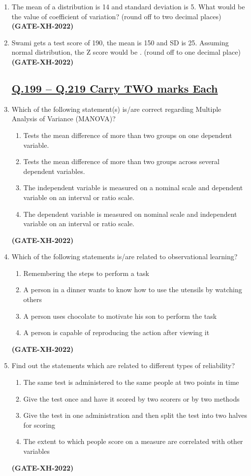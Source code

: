 \documentclass[journal]{IEEEtran}
\begin{document}
\begin{enumerate}
\item The mean of a distribution is 14 and standard deviation is 5. What would be the value of coefficient of variation? (round off to two decimal places)
\hfill\textbf{(GATE-XH-2022)}

\item Swami gets a test score of 190, the mean is 150 and SD is 25. Assuming normal distribution, the Z score would be \underline{\hspace{2cm}}. (round off to one decimal place)
\hfill\textbf{(GATE-XH-2022)}

\subsection*{\underline{\textbf {Q.199 – Q.219 Carry TWO marks Each}}}
\item
Which of the following statement(s) is/are correct regarding Multiple Analysis of Variance (MANOVA)? 
\begin{enumerate}
\item Tests the mean difference of more than two groups on one dependent variable.   
\item Tests the mean difference of more than two groups across several dependent variables.  
\item The independent variable is measured on a nominal scale and dependent variable on an interval or ratio scale. 
\item The dependent variable is measured on nominal scale and independent variable on an interval or ratio scale. 
\end{enumerate}
\hfill\textbf{(GATE-XH-2022)}

\item
Which of the following statements is/are related to observational learning? 
\begin{enumerate}
\item Remembering the steps to perform a task 
\item A person in a dinner wants to know how to use the utensils by watching others   
\item A person uses chocolate to motivate his son to perform the task 
\item A person is capable of reproducing the action after viewing it
\end{enumerate}
\hfill\textbf{(GATE-XH-2022)}

\item
Find out the statements which are related to different types of reliability?  
\begin{enumerate}
\item The same test is administered to the same people at two points in time 
\item Give the test once and have it scored by two scorers or by two methods 
\item Give the test in one administration and then split the test into two halves for scoring 
\item The extent to which people score on a measure are correlated with other variables  
\end{enumerate}
\hfill\textbf{(GATE-XH-2022)}


\end{enumerate}
\end{document}
